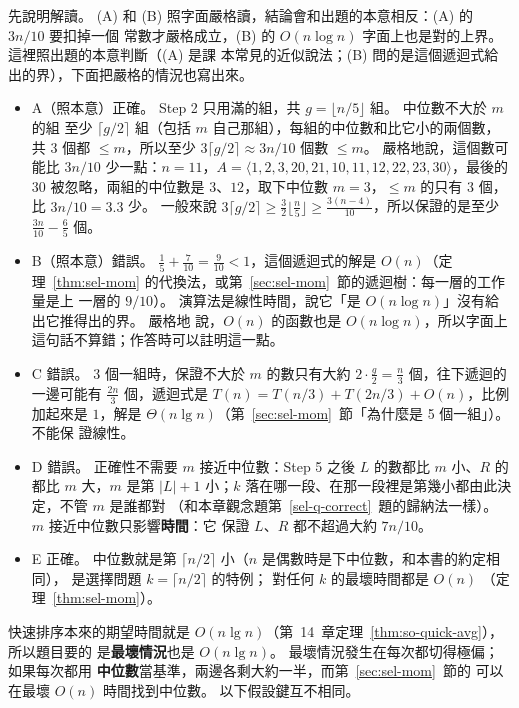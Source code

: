 先說明解讀。 (A) 和 (B) 照字面嚴格讀，結論會和出題的本意相反：(A) 的 $3n/10$ 要扣掉一個
常數才嚴格成立，(B) 的 $O(n \log n)$ 字面上也是對的上界。 這裡照出題的本意判斷（(A) 是課
本常見的近似說法；(B) 問的是這個遞迴式給出的界），下面把嚴格的情況也寫出來。
\begin{itemize}
\item A（照本意）正確。 Step 2 只用滿的組，共 $g = \lfloor n/5 \rfloor$ 組。 中位數不大於 $m$ 的組
至少 $\lceil g/2 \rceil$ 組（包括 $m$ 自己那組），每組的中位數和比它小的兩個數，共 $3$ 個都
$\le m$，所以至少 $3\lceil g/2 \rceil \approx 3n/10$ 個數 $\le m$。 嚴格地說，這個數可能比
$3n/10$ 少一點：$n = 11$，$A = \langle 1, 2, 3, 20, 21, 10, 11, 12, 22, 23, 30 \rangle$，最後的
$30$ 被忽略，兩組的中位數是 $3$、$12$，取下中位數 $m = 3$，$\le m$ 的只有 $3$ 個，比
$3n/10 = 3.3$ 少。 一般來說 $3\lceil g/2 \rceil \ge \frac{3}{2}\lfloor \frac{n}{5} \rfloor
\ge \frac{3(n-4)}{10}$，所以保證的是至少 $\frac{3n}{10} - \frac{6}{5}$ 個。
\item B（照本意）錯誤。 $\frac{1}{5} + \frac{7}{10} = \frac{9}{10} < 1$，這個遞迴式的解是
$O(n)$（定理~\ref{thm:sel-mom} 的代換法，或第~\ref{sec:sel-mom}~節的遞迴樹：每一層的工作量是上
一層的 $9/10$）。 演算法是線性時間，說它「是 $O(n \log n)$」沒有給出它推得出的界。 嚴格地
說，$O(n)$ 的函數也是 $O(n \log n)$，所以字面上這句話不算錯；作答時可以註明這一點。
\item C 錯誤。 $3$ 個一組時，保證不大於 $m$ 的數只有大約 $2 \cdot \frac{g}{2} = \frac{n}{3}$
個，往下遞迴的一邊可能有 $\frac{2n}{3}$ 個，遞迴式是 $T(n) = T(n/3) + T(2n/3) + O(n)$，比例
加起來是 $1$，解是 $\Theta(n \lg n)$（第~\ref{sec:sel-mom}~節「為什麼是 5 個一組」）。 不能保
證線性。
\item D 錯誤。 正確性不需要 $m$ 接近中位數：Step 5 之後 $L$ 的數都比 $m$ 小、$R$ 的都比 $m$
大，$m$ 是第 $|L| + 1$ 小；$k$ 落在哪一段、在那一段裡是第幾小都由此決定，不管 $m$ 是誰都對
（和本章觀念題第~\ref{sel-q-correct}~題的歸納法一樣）。 $m$ 接近中位數只影響\textbf{時間}：它
保證 $L$、$R$ 都不超過大約 $7n/10$。
\item E 正確。 中位數就是第 $\lceil n/2 \rceil$ 小（$n$ 是偶數時是下中位數，和本書的約定相同），
是選擇問題 $k = \lceil n/2 \rceil$ 的特例； 對任何 $k$ 的最壞時間都是 $O(n)$
（定理~\ref{thm:sel-mom}）。
\end{itemize}

快速排序本來的期望時間就是 $O(n \lg n)$（第~14~章定理~\ref{thm:so-quick-avg}），所以題目要的
是\textbf{最壞情況}也是 $O(n \lg n)$。 最壞情況發生在每次都切得極偏；如果每次都用
\textbf{中位數}當基準，兩邊各剩大約一半，而第~\ref{sec:sel-mom}~節的  可以在最壞
$O(n)$ 時間找到中位數。 以下假設鍵互不相同。

